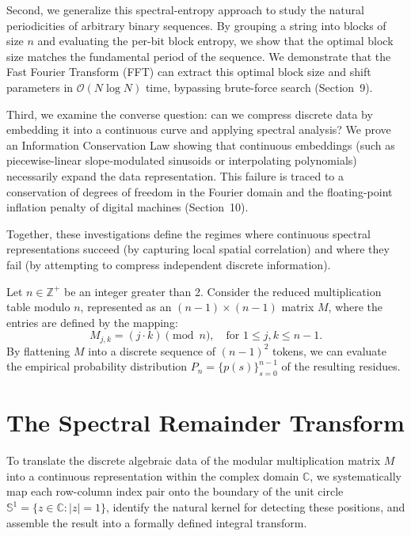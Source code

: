 \documentclass[11pt,twoside]{article}
\begin{document}
	Second, we generalize this spectral-entropy approach to study the natural periodicities of arbitrary binary sequences. By grouping a string into blocks of size $n$ and evaluating the per-bit block entropy, we show that the optimal block size matches the fundamental period of the sequence. We demonstrate that the Fast Fourier Transform (FFT) can extract this optimal block size and shift parameters in $\mathcal{O}(N \log N)$ time, bypassing brute-force search (Section~9).
	
	Third, we examine the converse question: can we compress discrete data by embedding it into a continuous curve and applying spectral analysis? We prove an Information Conservation Law showing that continuous embeddings (such as piecewise-linear slope-modulated sinusoids or interpolating polynomials) necessarily expand the data representation. This failure is traced to a conservation of degrees of freedom in the Fourier domain and the floating-point inflation penalty of digital machines (Section~10).
	
	Together, these investigations define the regimes where continuous spectral representations succeed (by capturing local spatial correlation) and where they fail (by attempting to compress independent discrete information).

	Let $n \in \mathbb{Z}^+$ be an integer greater than 2. Consider the reduced multiplication table modulo $n$, represented as an $(n-1) \times (n-1)$ matrix $M$, where the entries are defined by the mapping:
	\begin{equation}
		M_{j,k} = (j \cdot k) \pmod n, \quad \text{for } 1 \le j, k \le n-1.
	\end{equation}
	By flattening $M$ into a discrete sequence of $(n-1)^2$ tokens, we can evaluate the empirical probability distribution $P_n = \{p(s)\}_{s=0}^{n-1}$ of the resulting residues.
	
	\section{The Spectral Remainder Transform}
	
	To translate the discrete algebraic data of the modular multiplication matrix $M$ into a continuous representation within the complex domain $\mathbb{C}$, we systematically map each row-column index pair onto the boundary of the unit circle $\mathbb{S}^1 = \{z \in \mathbb{C} : |z| = 1\}$, identify the natural kernel for detecting these positions, and assemble the result into a formally defined integral transform.
	
\end{document}
